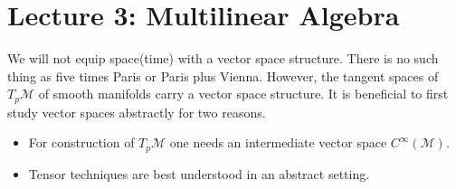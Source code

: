 \documentclass[10pt, oneside]{article}
\newcommand{\M}{\mathcal{M}}
\begin{document}
\section{Lecture 3: Multilinear Algebra}
        We will not equip space(time) with a vector space structure. There is no such thing as five times Paris or Paris plus Vienna. However, the tangent spaces of $T_p \M$ of smooth manifolds carry a vector space structure.
        It is beneficial to first study vector spaces abstractly for two reasons.
        \begin{itemize}
           \item For construction of $T_p \M$ one needs an intermediate vector space $C^\infty (\M)$.
           \item Tensor techniques are best understood in an abstract setting.
        \end{itemize}
\end{document}

